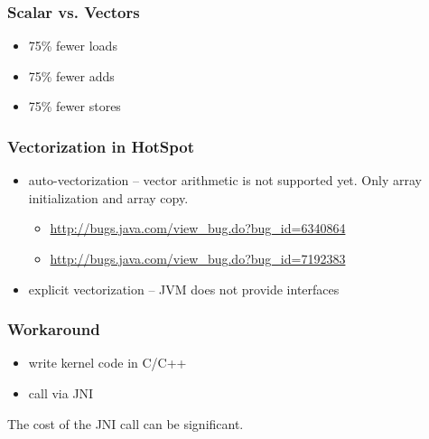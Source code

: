 \documentclass{beamer}
\begin{document}
  	\begin{frame}
    		\frametitle{Scalar vs. Vectors}
    		\begin{itemize}
    			\item 75\% fewer loads
    		    	\item 75\% fewer adds
    		    	\item 75\% fewer stores
		\end{itemize}
  	\end{frame}  	
  	\begin{frame}
  		
  	\end{frame}
  	\begin{frame}
  		\frametitle{Vectorization in HotSpot}
		\begin{itemize}
		\item auto-vectorization -- vector arithmetic is not supported yet. Only array initialization and array copy.
  		\begin{itemize}
  			\item \url{http://bugs.java.com/view_bug.do?bug_id=6340864}
  			\item \url{http://bugs.java.com/view_bug.do?bug_id=7192383}
  		\end{itemize}
  		\item explicit vectorization -- JVM does not provide interfaces
		\end{itemize}
  	\end{frame}
  	\begin{frame}
  	  	\frametitle{Workaround}
  	  	\begin{itemize}
  	  	\item write kernel code in C/C++
  	  	\item call via JNI
  	  	\end{itemize}
  	  	\pause
  	  	\vskip15pt 
  	  	The cost of the JNI call can be significant.
  	\end{frame}
\end{document}
